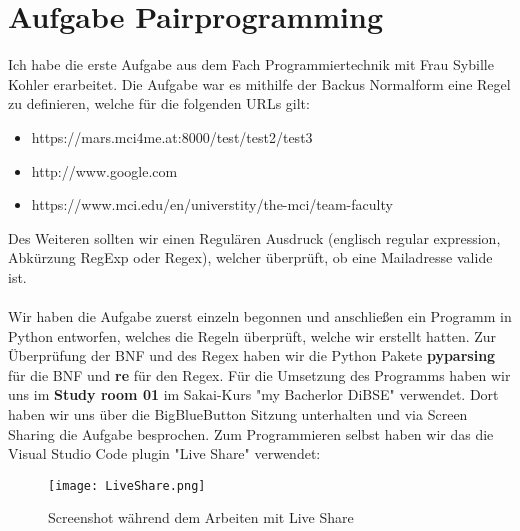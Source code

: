 \documentclass[12pt]{article}
\begin{document}
\restoregeometry
\nopagecolor
\tableofcontents
\pagebreak
\section{Aufgabe Pairprogramming}
Ich habe die erste Aufgabe aus dem Fach Programmiertechnik mit Frau Sybille Kohler erarbeitet. Die Aufgabe war es mithilfe der Backus Normalform eine Regel zu definieren, welche für die folgenden URLs gilt:
\begin{itemize}
 \item https://mars.mci4me.at:8000/test/test2/test3
 \item http://www.google.com
 \item https://www.mci.edu/en/universtity/the-mci/team-faculty
\end{itemize}
Des Weiteren sollten wir einen Regulären Ausdruck (englisch regular expression, Abkürzung RegExp oder Regex), welcher überprüft, ob eine Mailadresse valide ist.\\\\
Wir haben die Aufgabe zuerst einzeln begonnen und anschließen ein Programm in Python entworfen, welches die Regeln überprüft, welche wir erstellt hatten. Zur Überprüfung der BNF und des Regex haben wir die Python Pakete \textbf{pyparsing} für die BNF und \textbf{re} für den Regex. Für die Umsetzung des Programms haben wir uns im \textbf{Study room 01} im Sakai-Kurs "my Bacherlor DiBSE" verwendet. Dort haben wir uns über die BigBlueButton Sitzung unterhalten und via Screen Sharing die Aufgabe besprochen. Zum Programmieren selbst haben wir das die Visual Studio Code plugin "Live Share" verwendet:
\begin{figure}[h]
 \begin{center}
  \texttt{[image: LiveShare.png]}
  \caption{Screenshot während dem Arbeiten mit Live Share}
 \end{center}
\end{figure}
\end{document}
